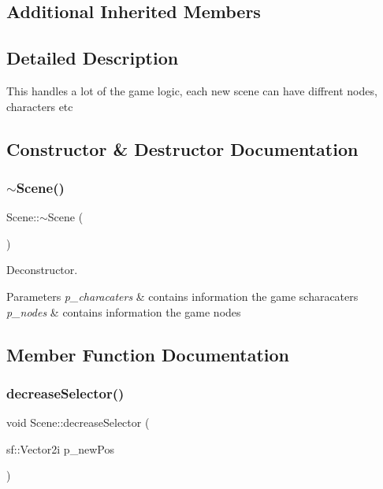 \subsection*{Additional Inherited Members}


\subsection{Detailed Description}
This handles a lot of the game logic, each new scene can have diffrent nodes, characters etc 

\subsection{Constructor \& Destructor Documentation}
\mbox{\label{class_scene_a3b8cec2e32546713915f8c6303c951f1}} 
\subsubsection{\texorpdfstring{$\sim$\+Scene()}{~Scene()}}
{\footnotesize\ttfamily Scene\+::$\sim$\+Scene (\begin{DoxyParamCaption}{ }\end{DoxyParamCaption})}



Deconstructor. 


\begin{DoxyParams}{Parameters}
{\em p\+\_\+characaters} & contains information the game scharacaters \\
\hline
{\em p\+\_\+nodes} & contains information the game nodes \\
\hline
\end{DoxyParams}


\subsection{Member Function Documentation}
\mbox{\label{class_scene_a2b3d2bde3505a1626ad5c8435025e9fc}} 
\subsubsection{\texorpdfstring{decrease\+Selector()}{decreaseSelector()}}
{\footnotesize\ttfamily void Scene\+::decrease\+Selector (\begin{DoxyParamCaption}\item[{sf\+::\+Vector2i}]{p\+\_\+new\+Pos }\end{DoxyParamCaption})}



